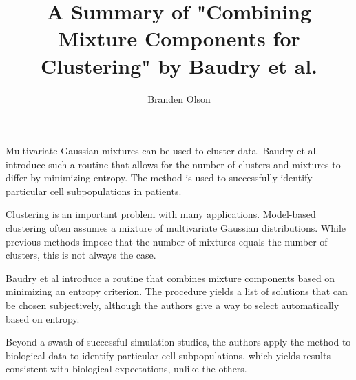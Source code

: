 \documentclass[11pt]{article}
\renewcommand\;{\,}
\begin{document}
\title{A Summary of "Combining Mixture Components for Clustering" by Baudry et al.}
\author{Branden Olson}
\date{}
\maketitle

Multivariate Gaussian mixtures can be used to cluster data.
Baudry et al. introduce such a routine that allows for the number of clusters and mixtures to differ by minimizing entropy.
The method is used to successfully identify particular cell subpopulations in patients.


Clustering is an important problem with many applications.
Model-based clustering often assumes a mixture of multivariate Gaussian distributions.
While previous methods impose that the number of mixtures equals the number of clusters, this is not always the case.

Baudry et al introduce a routine that combines mixture components based on minimizing an entropy criterion.
The procedure yields a list of solutions that can be chosen subjectively, although the authors give a way to select automatically based on entropy. 

Beyond a swath of successful simulation studies, the authors apply the method to biological data to identify particular cell subpopulations, which yields results consistent with biological expectations, unlike the others.
\end{document}
